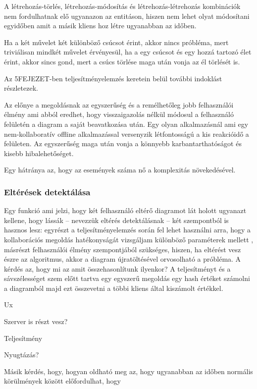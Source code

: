 A létrehozás-törlés, létrehozás-módosítás és létrehozás-létrehozás kombinációk nem fordulhatnak elő ugyanazon az entitáson, hiszen nem lehet olyat módosítani egyidőben amit a másik kliens hoz létre ugyanabban az időben.

Ha a két művelet két különböző csúcsot érint, akkor nincs próbléma, mert triviálisan mindkét művelet érvényesül, ha a egy csúcsot és egy hozzá tartozó élet érint, akkor sincs gond, mert a csúcs törlése maga után vonja az él törlését is. 

Az 5FEJEZET-ben teljesítményelemzés keretein belül további indoklást részletezek. 

Az előnye a megoldásnak az egyszerűség és a remélhetőleg jobb felhasználói élmény ami abból eredhet, hogy visszaigazolás nélkül módosul a felhasználó felületén a diagram a saját beavatkozása után. Egy olyan alkalmazásnál ami egy nem-kollaboratív offline alkalmazással versenyzik létfontosságú a kis reakcióidő a felületen. Az egyszerűség maga után vonja a könnyebb karbantarthatóságot és kisebb hibalehetőséget.   


Egy hátránya az, hogy az események száma nő a komplexitás növekedésével. 



\subsubsection{Eltérések detektálása}

Egy funkció ami jelzi, hogy két felhasználó eltérő diagramot lát holott ugyanazt kellene, hogy lássák -- nevezzük eltérés detektálásnak -- két szempontból is hasznos lesz: egyrészt a teljesítményelemzés során fel lehet használni arra, hogy a kollaborációs megoldás hatékonyságát vizsgáljam különböző paraméterek mellett , másrészt felhasználói élmény szempontjából szükséges, hiszen, ha eltérést vesz észre az algoritmus, akkor a diagram újratöltésével orvosolható a próbléma. 
A kérdés az, hogy mi az amit összehasonlítunk ilyenkor? A teljesítményt és a sávszélességet szem előtt tartva egy egyszerű megoldás egy hash értéket számolni a diagramból majd ezt összevetni a többi kliens által kiszámolt értékkel.

Ux

Szerver is részt vesz?

Teljesítmény

Nyugtázás?

Másik kérdés, hogy, hogyan oldható meg az, hogy ugyanabban az időben normális körülmények között előfordulhat, hogy 




